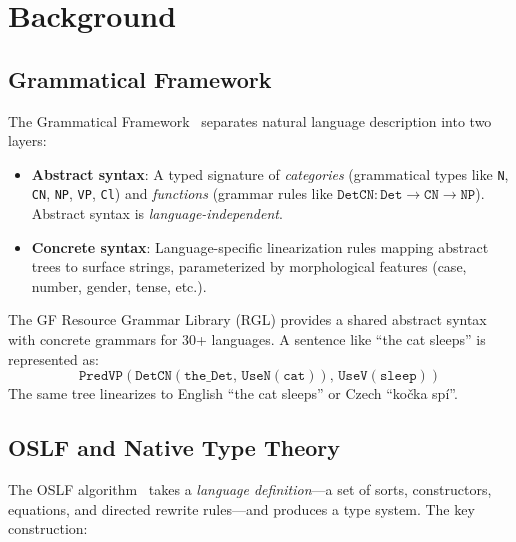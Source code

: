 \documentclass[11pt]{article}
\newcommand{\code}[1]{\texttt{#1}}
\newcommand{\OSLF}{\textup{OSLF}}
\newcommand{\GF}{\textup{GF}}
\newcommand{\RGL}{\textup{RGL}}
\begin{document}
\section{Background}
\label{sec:background}

\subsection{Grammatical Framework}

The Grammatical Framework~\cite{Ranta2004,Ranta2011} separates natural
language description into two layers:

\begin{itemize}
\item \textbf{Abstract syntax}: A typed signature of \emph{categories}
  (grammatical types like \code{N}, \code{CN}, \code{NP}, \code{VP},
  \code{Cl}) and \emph{functions} (grammar rules like
  $\code{DetCN} : \code{Det} \to \code{CN} \to \code{NP}$).  Abstract
  syntax is \emph{language-independent}.
\item \textbf{Concrete syntax}: Language-specific linearization rules mapping
  abstract trees to surface strings, parameterized by morphological features
  (case, number, gender, tense, etc.).
\end{itemize}

The \GF{} Resource Grammar Library (\RGL{}) provides a shared abstract syntax
with concrete grammars for 30+ languages.  A sentence like ``the cat sleeps''
is represented as:
\[
  \code{PredVP}(\code{DetCN}(\code{the\_Det},\, \code{UseN}(\code{cat})),\,
  \code{UseV}(\code{sleep}))
\]
The same tree linearizes to English ``the cat sleeps'' or Czech
``ko\v{c}ka sp\'{i}''.

\subsection{OSLF and Native Type Theory}

The \OSLF{} algorithm~\cite{MeredithStayOSLF2020} takes a \emph{language
definition}---a set of sorts, constructors, equations, and directed rewrite
rules---and produces a type system.  The key construction:
\end{document}

